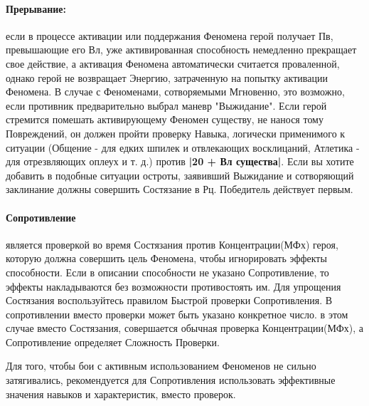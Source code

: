 \paragraph{Прерывание:} если в процессе активации или поддержания Феномена герой получает Пв, превышающие его Вл, уже активированная способность немедленно прекращает свое действие, а активация Феномена автоматически считается проваленной, однако герой не возвращает Энергию, затраченную на попытку активации Феномена. В случае с Феноменами, сотворяемыми Мгновенно, это возможно, если противник предварительно выбрал маневр "Выжидание".
\newline
Если герой стремится помешать активирующему Феномен существу, не нанося тому Повреждений, он должен пройти проверку Навыка, логически применимого к ситуации (Общение - для едких шпилек и отвлекающих восклицаний, Атлетика - для отрезвляющих оплеух и т. д.) против \textbf{|20 + Вл существа|}.
\newline
Если вы хотите добавить в подобные ситуации остроты, заявивший Выжидание и сотворяющий заклинание должны совершить Состязание в Рц. Победитель действует первым.
\paragraph{Сопротивление} является проверкой во время Состязания против Концентрации(МФх) героя, которую должна совершить цель Феномена, чтобы игнорировать эффекты способности. Если в описании способности не указано Сопротивление, то эффекты накладываются без возможности противостоять им. Для упрощения Состязания воспользуйтесь правилом Быстрой проверки Сопротивления. В сопротивлении вместо проверки может быть указано конкретное число. в этом случае вместо Состязания, совершается обычная проверка Концентрации(МФх), а Сопротивление определяет Сложность Проверки.
\begin{tcolorbox}
Для того, чтобы бои с активным использованием Феноменов не сильно затягивались, рекомендуется для Сопротивления использовать эффективные значения навыков и характеристик, вместо проверок.
\end{tcolorbox}

